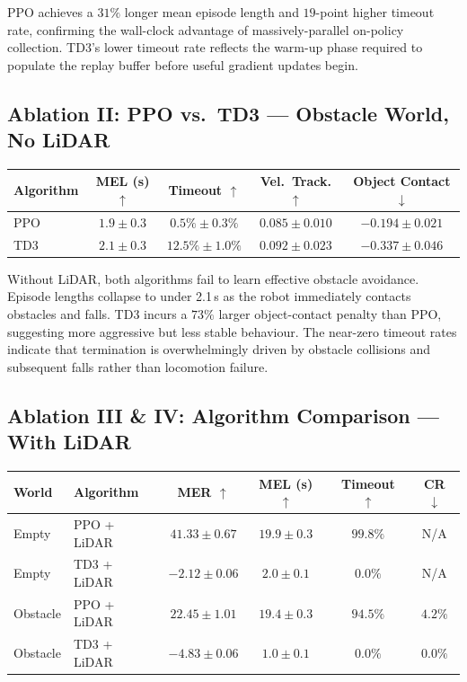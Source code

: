 \documentclass{article}
\begin{document}
PPO achieves a $31\%$ longer mean episode length and $19$-point higher timeout
rate, confirming the wall-clock advantage of massively-parallel on-policy
collection. TD3's lower timeout rate reflects the warm-up phase required to
populate the replay buffer before useful gradient updates begin.

\subsection{Ablation II: PPO vs.\ TD3 — Obstacle World, No LiDAR}

\begin{center}
\begin{tabular}{lcccc}
  \toprule
  \textbf{Algorithm} & \textbf{MEL (s)} $\uparrow$ & \textbf{Timeout} $\uparrow$
    & \textbf{Vel.\ Track.} $\uparrow$ & \textbf{Object Contact} $\downarrow$ \\
  \midrule
  PPO & $1.9 \pm 0.3$ & $0.5\% \pm 0.3\%$ & $0.085 \pm 0.010$ & $-0.194 \pm 0.021$ \\
  TD3 & $2.1 \pm 0.3$ & $12.5\% \pm 1.0\%$ & $0.092 \pm 0.023$ & $-0.337 \pm 0.046$ \\
  \bottomrule
\end{tabular}
\end{center}

Without LiDAR, both algorithms fail to learn effective obstacle avoidance.
Episode lengths collapse to under 2.1\,s as the robot immediately contacts
obstacles and falls. TD3 incurs a $73\%$ larger object-contact penalty than
PPO, suggesting more aggressive but less stable behaviour. The near-zero
timeout rates indicate that termination is overwhelmingly driven by obstacle
collisions and subsequent falls rather than locomotion failure.

\subsection{Ablation III \& IV: Algorithm Comparison — With LiDAR}

\begin{center}
\begin{tabular}{llcccc}
  \toprule
  \textbf{World} & \textbf{Algorithm} & \textbf{MER} $\uparrow$
    & \textbf{MEL (s)} $\uparrow$ & \textbf{Timeout} $\uparrow$ & \textbf{CR} $\downarrow$ \\
  \midrule
  Empty    & PPO + LiDAR & $41.33 \pm 0.67$ & $19.9 \pm 0.3$ & $99.8\%$ & N/A \\
  Empty    & TD3 + LiDAR & $-2.12 \pm 0.06$ & $2.0 \pm 0.1$  & $0.0\%$  & N/A \\
  Obstacle & PPO + LiDAR & $22.45 \pm 1.01$ & $19.4 \pm 0.3$ & $94.5\%$ & $4.2\%$ \\
  Obstacle & TD3 + LiDAR & $-4.83 \pm 0.06$ & $1.0 \pm 0.1$  & $0.0\%$  & $0.0\%$ \\
  \bottomrule
\end{tabular}
\end{center}
\end{document}
